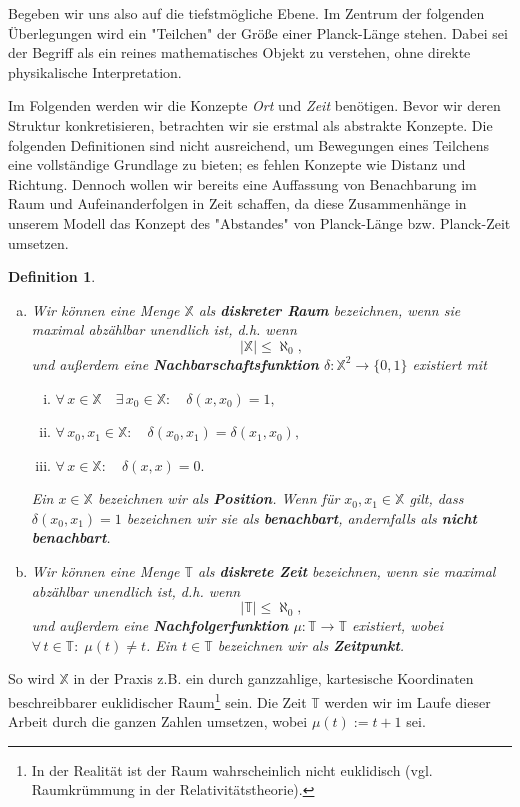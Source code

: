 \documentclass[a4paper,12pt,ngerman]{scrartcl}
\theoremstyle{plain}
\newtheorem{definition}{Definition}
\theoremstyle{plain}
\theoremstyle{plain}
\theoremstyle{plain}
\newcommand{\T}{\mathbb{T}}
\newcommand{\X}{\mathbb{X}}
\begin{document}
Begeben wir uns also auf die tiefstmögliche Ebene. Im Zentrum der folgenden Überlegungen wird ein "Teilchen" der Größe einer Planck-Länge stehen. Dabei sei der Begriff als ein reines mathematisches Objekt zu verstehen, ohne direkte physikalische Interpretation.

Im Folgenden werden wir die Konzepte \textit{Ort} und \textit{Zeit} benötigen. Bevor wir deren Struktur konkretisieren, betrachten wir sie erstmal als abstrakte Konzepte. Die folgenden Definitionen sind nicht ausreichend, um Bewegungen eines Teilchens eine vollständige Grundlage zu bieten; es fehlen Konzepte wie Distanz und Richtung. Dennoch wollen wir bereits eine Auffassung von Benachbarung im Raum und Aufeinanderfolgen in Zeit schaffen, da diese Zusammenhänge in unserem Modell das Konzept des "Abstandes" von Planck-Länge bzw. Planck-Zeit umsetzen.

{
\begin{definition}\label{def_ortundzeit}
\begin{enumerate}[(a)]
	\item Wir können eine Menge $\X$ als \textbf{diskreter Raum} 	bezeichnen, wenn sie maximal abzählbar unendlich ist, d.h. 			wenn
	\[ |\X| \leq \aleph_0,\]
	und außerdem eine \textbf{Nachbarschaftsfunktion} $\delta: 			\X^2\rightarrow\{0,1\}$ existiert mit
	\begin{enumerate}[(i)]
		\item$\forall\, x\in\X\quad\exists\, x_0\in\X: \quad				\delta(x,x_0)=1,$
		\item$\forall\, x_0,x_1\in\X: \quad\delta(x_0,x_1)=					\delta(x_1,x_0),$ 
		\item$\forall\, x\in\X: \quad \delta(x,x)=0.$
	\end{enumerate}
	Ein $x\in\X$ bezeichnen wir als \textbf{Position}. Wenn für 		$x_0,x_1\in\X$ gilt, dass $\delta(x_0,x_1)=1$ bezeichnen wir 	sie als \textbf{benachbart}, andernfalls als \textbf{nicht 			benachbart}. 
	\item Wir können eine Menge $\T$ als \textbf{diskrete Zeit} 		bezeichnen, wenn sie maximal abzählbar unendlich ist, d.h. 			wenn
	\[ |\T| \leq \aleph_0,\]
	und außerdem eine \textbf{Nachfolgerfunktion} $\mu: \T 				\rightarrow \T$ existiert, wobei $\forall \,t\in\T: \;\mu(t)		\neq t$. Ein $t\in\T$ bezeichnen wir als \textbf{Zeitpunkt}.
\end{enumerate}
\end{definition} %
}

So wird $\X$ in der Praxis z.B. ein durch ganzzahlige, kartesische Koordinaten beschreibbarer euklidischer Raum\footnote{In der Realität ist der Raum wahrscheinlich nicht euklidisch (vgl. Raumkrümmung in der Relativitätstheorie).} sein. Die Zeit $\T$ werden wir im Laufe dieser Arbeit durch die ganzen Zahlen umsetzen, wobei $\mu(t):=t+1$ sei.
\end{document}

